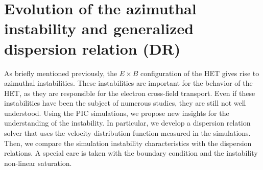 



\chapter{Evolution of the azimuthal instability and generalized dispersion relation (DR)}
\label{ch-5}



\begin{Chabstract}
  
As briefly mentioned previously, the $E \times B$ configuration of the \ac{HET} gives rise to azimuthal instabilities.
These instabilities are important for the behavior of the \ac{HET}, as they are responsible for the electron cross-field transport.
Even if these instabilities have been the subject of numerous studies, they are still not well understood.
Using the \ac{PIC} simulations, we propose new insights for the understanding of the instability.
In particular, we develop a dispersion relation solver that uses the velocity distribution function measured in the simulations.
Then, we compare the simulation instability characteristics with the dispersion relations.
A special care is taken with the boundary condition and the instability non-linear saturation.
\end{Chabstract}

% 
% 

\minitoc








